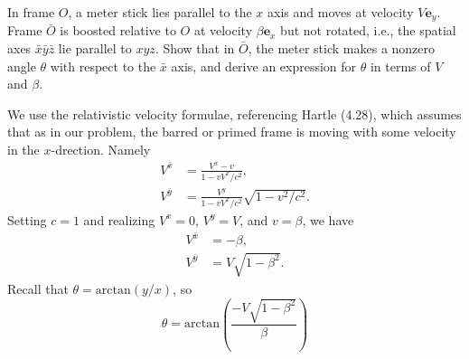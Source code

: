 \documentclass[11pt,largemargins]{homework}
\begin{document}
\maketitle

\question
In frame $O$, a meter stick lies parallel to the $x$ axis and moves at velocity $V \mathbf{e}_y$.  Frame $\bar{O}$ is boosted relative to $O$ at velocity $\beta \mathbf{e}_x$ but not rotated, i.e., the spatial axes $\bar{x}\bar{y}\bar{z}$ lie parallel to $xyz$.  Show that in $\bar{O}$, the meter stick makes a nonzero angle $\theta$ with respect to the $\bar{x}$ axis, and derive an expression for $\theta$ in terms of $V$ and $\beta$. 

We use the relativistic velocity formulae, referencing Hartle (4.28), which assumes that as in our problem, the barred or primed frame is moving with some velocity in the $x$-drection.  Namely
\begin{subequations}
\begin{align}
V^{\bar{x}} &= \frac{V^{x} - v}{1 - v V^{x} / c^2}, \\
V^{\bar{y}} &= \frac{V^{y}}{1 - v V^{x} / c^2} \sqrt{1 - v^2 / c^2}.
\end{align}
\end{subequations}
Setting $c = 1$ and realizing $V^{x} = 0$, $V^{y} = V$, and $v = \beta$, we have
\begin{subequations}
\begin{align}
V^{\bar{x}} &= -\beta, \\
V^{\bar{y}} &= V \sqrt{1 - \beta^2}.
\end{align}
\end{subequations}
Recall that $\theta = \mathrm{arctan}(y / x)$, so 
\begin{equation}
\theta = \mathrm{arctan}(\frac{-V \sqrt{1 - \beta^2}}{\beta})
\end{equation}
\end{document}
